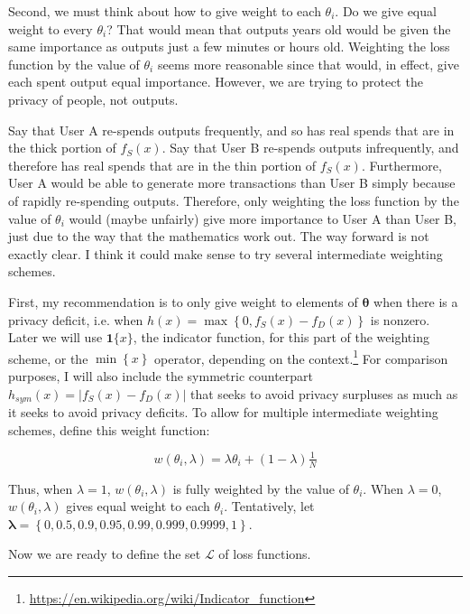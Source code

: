\documentclass[english]{article}
\begin{document}
Second, we must think about how to give weight to each $\theta_{i}$.
Do we give equal weight to every $\theta_{i}$? That would mean that
outputs years old would be given the same importance as outputs just
a few minutes or hours old. Weighting the loss function by the value
of $\theta_{i}$ seems more reasonable since that would, in effect,
give each spent output equal importance. However, we are trying to
protect the privacy of people, not outputs. 

Say that User A re-spends outputs frequently, and so has real spends
that are in the thick portion of $f_{S}(x)$. Say that User B re-spends
outputs infrequently, and therefore has real spends that are in the
thin portion of $f_{S}(x)$. Furthermore, User A would be able to
generate more transactions than User B simply because of rapidly re-spending
outputs. Therefore, only weighting the loss function by the value
of $\theta_{i}$ would (maybe unfairly) give more importance to User
A than User B, just due to the way that the mathematics work out.
The way forward is not exactly clear. I think it could make sense
to try several intermediate weighting schemes.

First, my recommendation is to only give weight to elements of $\boldsymbol{\theta}$
when there is a privacy deficit, i.e. when $h(x)=\max\left\{ 0,f_{S}(x)-f_{D}(x)\right\} $
is nonzero. Later we will use $\boldsymbol{1}\{x\}$, the indicator
function, for this part of the weighting scheme, or the $\min\left\{ x\right\} $
operator, depending on the context.\footnote{\href{https://en.wikipedia.org/wiki/Indicator_function}{https://en.wikipedia.org/wiki/Indicator\_function}}
For comparison purposes, I will also include the symmetric counterpart
$h_{sym}(x)=\left|f_{S}(x)-f_{D}(x)\right|$ that seeks to avoid privacy
surpluses as much as it seeks to avoid privacy deficits. To allow
for multiple intermediate weighting schemes, define this weight function: 

\begin{equation}
w(\theta_{i},\lambda)=\lambda\theta_{i}+(1-\lambda)\tfrac{1}{N}\label{eq:weight-fn}
\end{equation}

Thus, when $\lambda=1$, $w(\theta_{i},\lambda)$ is fully weighted
by the value of $\theta_{i}$. When $\lambda=0$, $w(\theta_{i},\lambda)$
gives equal weight to each $\theta_{i}$. Tentatively, let $\boldsymbol{\lambda}=\left\{ 0,0.5,0.9,0.95,0.99,0.999,0.9999,1\right\} $.

Now we are ready to define the set $\mathcal{L}$ of loss functions.
\end{document}
